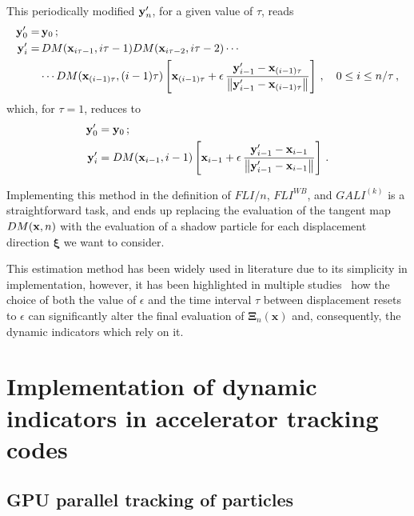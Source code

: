 This periodically modified $\vb{y}'_n$, for a given value of $\tau$, reads
\begin{equation}
    \begin{aligned}
        \vb{y}'_0 =&\, \vb{y}_0 \,;  \\
        \vb{y}'_i =&\, DM(\vb{x}_{i\tau - 1}, i\tau - 1)DM(\vb{x}_{i\tau - 2}, i\tau - 2)\cdots \\
        &\cdots DM(\vb{x}_{(i-1)\tau}, (i-1)\tau)\left[\vb{x}_{(i-1)\tau}+\epsilon\,\frac{\vb{y}'_{i-1}-\vb{x}_{(i-1)\tau}}{\norm{\vb{y}'_{i-1}-\vb{x}_{(i-1)\tau}}}\right]\,, \quad 0 \leq i \leq n/\tau \,,        
    \end{aligned}
\end{equation}
which, for $\tau=1$, reduces to
\begin{equation}
\begin{aligned}
    \vb{y}'_0 &= \vb{y}_0 \,; \\
    \vb{y}'_i &= DM(\vb{x}_{i-1}, i-1)\left[\vb{x}_{i-1}+\epsilon\,\frac{\vb{y}'_{i-1}-\vb{x}_{i-1}}{\norm{\vb{y}'_{i-1}-\vb{x}_{i-1}}}\right]\,.
\end{aligned}
\end{equation}

Implementing this method in the definition of $FLI/n$, $FLI^{WB}$, and $GALI^{(k)}$ is a straightforward task, and ends up replacing the evaluation of the tangent map $DM(\vb{x}, n)$ with the evaluation of a shadow particle for each displacement direction $\boldsymbol{\xi}$ we want to consider.

This estimation method has been widely used in literature due to its simplicity in implementation, however, it has been highlighted in multiple studies~\cite{Tancredi_2001, Skokos2010b} how the choice of both the value of $\epsilon$ and the time interval $\tau$ between displacement resets to $\epsilon$ can significantly alter the final evaluation of $\boldsymbol{\Xi}_{n}(\mathbf{x})$ and, consequently, the dynamic indicators which rely on it.


\section{Implementation of dynamic indicators in accelerator tracking codes} \label{sec:implement}
%

\subsection{GPU parallel tracking of particles}


